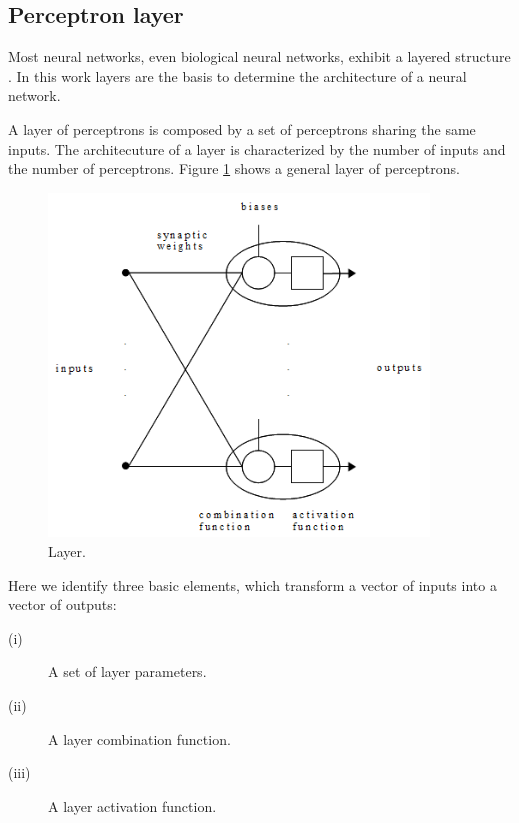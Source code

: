 \subsection*{Perceptron layer}

Most neural networks, even biological neural networks, exhibit a
layered structure \cite{Sima2003} \cite{Demuth2009}. In this work layers are the basis to
determine the architecture of a neural network.

A layer of perceptrons is composed by a set of perceptrons sharing the same inputs. 
The architecuture of a layer is characterized by the number of inputs and the number of perceptrons. 
Figure \ref{PerceptronLayerFigure} shows a general layer of perceptrons. 

\begin{figure}[h!]
\begin{center}
\includegraphics[width=0.9\textwidth]{neural_network/perceptron_layer}
\caption{Layer.}\label{PerceptronLayerFigure}
\end{center}
\end{figure}

Here we identify three basic elements, which transform a vector of inputs
into a vector of outputs: 

\begin{description}
\item[(i)] A set of layer parameters. 
\item[(ii)] A layer combination function.  
\item[(iii)] A layer activation function.
\end{description}


